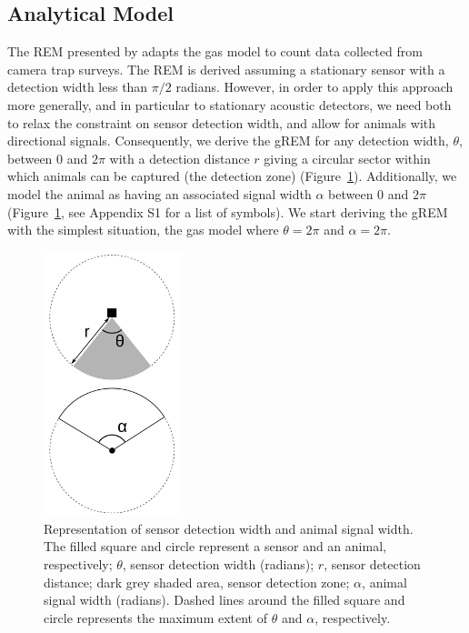 \documentclass[a4paper,10pt,reqno,oneside]{amsart}
\begin{document}
\subsection*{Analytical Model}

The REM presented by \citet{rowcliffe2008estimating} adapts the gas model to count data collected from camera trap surveys. The REM is derived assuming a stationary sensor with a detection width less than $\pi/2$ radians. However, in order to apply this approach more generally, and in particular to stationary acoustic detectors, we need both to relax the constraint on sensor detection width, and allow for animals with directional signals. Consequently, we derive the gREM for any detection width, $ \theta$, between 0 and $2\pi$ with a detection distance $r$ giving a circular sector within which animals can be captured (the detection zone) (Figure~\ref{f:AngleDef}). Additionally, we model the animal as having an associated signal width $\alpha$ between 0 and $2\pi$  (Figure~\ref{f:AngleDef}, see Appendix S1 for a list of symbols). We start deriving the gREM with the simplest situation, the gas model where $\theta =  2\pi$ and $ \alpha =  2\pi$. 

\begin{figure}[t]
        \centering
	\includegraphics[width=4cm]{imgs/angleDefinitions.pdf}

\caption{Representation of sensor detection width and animal signal width. The filled square and circle represent a sensor and an animal, respectively; $\theta$, sensor detection width (radians); $r$, sensor detection distance; dark grey shaded area, sensor detection zone; $\alpha$, animal signal width (radians). Dashed lines around the filled square and circle represents the maximum extent of $\theta$ and $\alpha$, respectively.} 
\label{f:AngleDef}
\end{figure}
\end{document}
